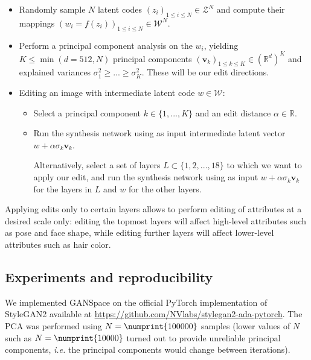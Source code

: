 \documentclass[a4paper]{article}
\begin{document}
\begin{itemize}
    \item Randomly sample $N$ latent codes $(z_i)_{1 \leq i \leq N} \in \mathcal{Z}^N$ and compute their mappings $(w_i = f(z_i))_{1 \leq i \leq N} \in \mathcal{W}^N$.
    \item Perform a principal component analysis on the $w_i$, yielding $K \leq \min(d = 512, N)$ principal components $(\mathbf{v}_k)_{1 \leq k \leq K} \in (\mathbb{R}^d)^K$ and explained variances $\sigma_1^2 \geq ... \geq \sigma_K^2$. These will be our edit directions.
    \item Editing an image with intermediate latent code $w \in \mathcal{W}$:
    \begin{itemize}
        \item Select a principal component $k \in \{1, ..., K\}$ and an edit distance $\alpha \in \mathbb{R}$.
        \item Run the synthesis network using as input intermediate latent vector $w + \alpha \sigma_k \mathbf{v}_k$.

        Alternatively, select a set of layers $L \subset \{1, 2, ..., 18\}$ to which we want to apply our edit, and run the synthesis network using as input $w + \alpha \sigma_k \mathbf{v}_k$ for the layers in $L$ and $w$ for the other layers.
    \end{itemize}
\end{itemize}

Applying edits only to certain layers allows to perform editing of attributes at a desired scale only: editing the topmost layers will affect high-level attributes such as pose and face shape, while editing further layers will affect lower-level attributes such as hair color.

\subsection{Experiments and reproducibility}

We implemented GANSpace on the official PyTorch implementation of StyleGAN2 available at \url{https://github.com/NVlabs/stylegan2-ada-pytorch}. The PCA was performed using $N = \numprint{100000}$ samples (lower values of $N$ such as $N = \numprint{10000}$ turned out to provide unreliable principal components, \emph{i.e.} the principal components would change between iterations).
\end{document}
